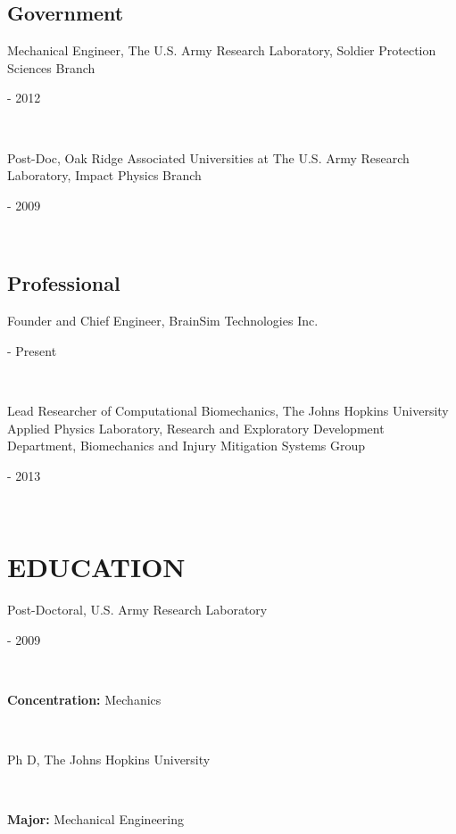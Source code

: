 \documentclass[a4paper,10pt]{article}
\begin{document}
    \subsection*{Government}
    
                \noindent \parbox[t]{0.8\linewidth}{\raggedright Mechanical Engineer, The U.S. Army Research Laboratory, Soldier Protection Sciences Branch} \hfill \parbox[t]{0.2\linewidth}{ - 2012} \\
                
                \noindent \parbox[t]{0.8\linewidth}{\raggedright Post-Doc, Oak Ridge Associated Universities at The U.S. Army Research Laboratory, Impact Physics Branch} \hfill \parbox[t]{0.2\linewidth}{ - 2009} \\
                
    \subsection*{Professional}
    
                \noindent \parbox[t]{0.8\linewidth}{\raggedright Founder and Chief Engineer, BrainSim Technologies Inc.} \hfill \parbox[t]{0.2\linewidth}{ - Present} \\
                
                \noindent \parbox[t]{0.8\linewidth}{\raggedright Lead Researcher of Computational Biomechanics, The Johns Hopkins University Applied Physics Laboratory, Research and Exploratory Development Department, Biomechanics and Injury Mitigation Systems Group} \hfill \parbox[t]{0.2\linewidth}{ - 2013} \\
                

    \section*{EDUCATION}
    
            \noindent \parbox[t]{0.8\linewidth}{\raggedright Post-Doctoral, U.S. Army Research Laboratory} \hfill \parbox[t]{0.2\linewidth}{ - 2009} \\
            \noindent \parbox[t]{0.8\linewidth}{\raggedright \textbf{Concentration:} Mechanics} \\
            
            \noindent \parbox[t]{0.8\linewidth}{\raggedright Ph D, The Johns Hopkins University} \hfill \parbox[t]{0.2\linewidth}{} \\
            \noindent \parbox[t]{0.8\linewidth}{\raggedright \textbf{Major:} Mechanical Engineering} \\
            
\end{document}
